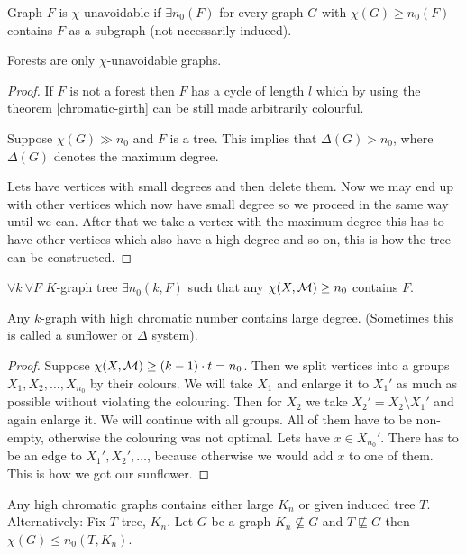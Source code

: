 \begin{defn}
	Graph $F$ is $\chi$-unavoidable if $\exists n_0(F)$ for every graph $G$ with $\chi(G) \geq n_0(F)$ contains $F$ as a subgraph (not necessarily induced).
\end{defn}

\begin{cor}
	Forests are only $\chi$-unavoidable graphs.
\end{cor}

\begin{proof}
	If $F$ is not a forest then $F$ has a cycle of length $l$ which by using the theorem \ref{chromatic-girth} can be still made arbitrarily colourful.
	
	Suppose $\chi(G) \gg n_0$ and $F$ is a tree. This implies that $\Delta(G) > n_0$, where $\Delta(G)$ denotes the maximum degree.
	
	Lets have vertices with small degrees and then delete them. Now we may end up with other vertices which now have small degree so we proceed in the same way until we can. After that we take a vertex with the maximum degree this has to have other vertices which also have a high degree and so on, this is how the tree can be constructed.
\end{proof}

\begin{cor}
	$\forall k \ \forall F$ $K$-graph tree $\exists n_0(k,F)$ such that any $\chi(X, \mathcal{M}) \geq n_0$ contains $F$.
\end{cor}

\begin{lemma}
	Any $k$-graph with high chromatic number contains large degree. (Sometimes this is called a sunflower or $\Delta$ system).
\end{lemma}

\begin{proof}
	Suppose $\chi(X, \mathcal{M}) \geq (k-1) \cdot t = n_0$. Then we split vertices into a groups $X_1, X_2, \dots, X_{n_0}$ by their colours. We will take $X_1$ and enlarge it to $X_1'$ as much as possible without violating the colouring. Then for $X_2$ we take $X_2' = X_2 \setminus X_1'$ and again enlarge it. We will continue with all groups. All of them have to be non-empty, otherwise the colouring was not optimal. Lets have $x \in X_{n_0}'$. There has to be an edge to $X_1', X_2', \dots$, because otherwise we would add $x$ to one of them. This is how we got our sunflower.
\end{proof}

\begin{conj}
	Any high chromatic graphs contains either large $K_n$ or given induced tree $T$. Alternatively: Fix $T$ tree, $K_n$. Let $G$ be a graph $K_n \nsubseteq G$ and $T \not\sqsubseteq G$ then $\chi(G) \leq n_0(T, K_n)$.
\end{conj}

